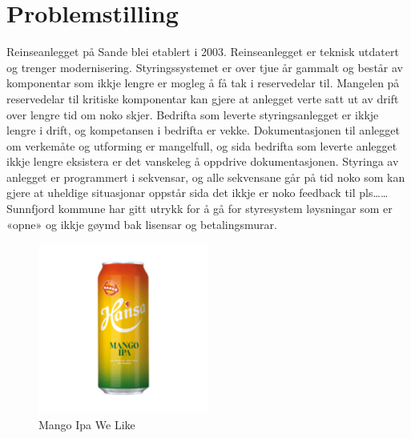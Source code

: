 \section{Problemstilling}
Reinseanlegget på Sande blei etablert i 2003. Reinseanlegget er teknisk utdatert og trenger modernisering. 
Styringssystemet er over tjue år gammalt og består av komponentar som ikkje lengre er mogleg å få tak i reservedelar til. 
Mangelen på reservedelar til kritiske komponentar kan gjere at anlegget verte satt ut av drift over lengre tid om noko skjer. 
Bedrifta som leverte styringsanlegget er ikkje lengre i drift, og kompetansen i bedrifta er vekke. 
Dokumentasjonen til anlegget om verkemåte og utforming er mangelfull, og sida bedrifta som leverte anlegget ikkje lengre eksistera er det vanskeleg å oppdrive dokumentasjonen.
Styringa av anlegget er programmert i sekvensar, og alle sekvensane går på tid noko som kan gjere at uheldige situasjonar oppstår sida det ikkje er noko feedback til pls……
Sunnfjord kommune har gitt utrykk for å gå for styresystem løysningar som er «opne» og ikkje gøymd bak lisensar og betalingsmurar.


\begin{figure}[htbp]
    \centering
    \includegraphics[width=0.5\textwidth]{Bilder/mango.jpg}
    \caption{Mango Ipa We Like}\label{fig:Mango-Loko}
\end{figure}
    